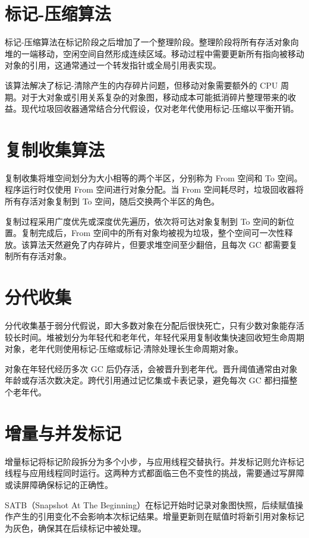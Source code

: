 \chapter{标记-压缩算法}
标记-压缩算法在标记阶段之后增加了一个整理阶段。整理阶段将所有存活对象向堆的一端移动，空闲空间自然形成连续区域。移动过程中需要更新所有指向被移动对象的引用，这通常通过一个转发指针或全局引用表实现。\par
该算法解决了标记-清除产生的内存碎片问题，但移动对象需要额外的 CPU 周期。对于大对象或引用关系复杂的对象图，移动成本可能抵消碎片整理带来的收益。现代垃圾回收器通常结合分代假设，仅对老年代使用标记-压缩以平衡开销。\par
\chapter{复制收集算法}
复制收集将堆空间划分为大小相等的两个半区，分别称为 From 空间和 To 空间。程序运行时仅使用 From 空间进行对象分配。当 From 空间耗尽时，垃圾回收器将所有存活对象复制到 To 空间，随后交换两个半区的角色。\par
复制过程采用广度优先或深度优先遍历，依次将可达对象复制到 To 空间的新位置。复制完成后，From 空间中的所有对象均被视为垃圾，整个空间可一次性释放。该算法天然避免了内存碎片，但要求堆空间至少翻倍，且每次 GC 都需要复制所有存活对象。\par
\chapter{分代收集}
分代收集基于弱分代假说，即大多数对象在分配后很快死亡，只有少数对象能存活较长时间。堆被划分为年轻代和老年代，年轻代采用复制收集快速回收短生命周期对象，老年代则使用标记-压缩或标记-清除处理长生命周期对象。\par
对象在年轻代经历多次 GC 后仍存活，会被晋升到老年代。晋升阈值通常由对象年龄或存活次数决定。跨代引用通过记忆集或卡表记录，避免每次 GC 都扫描整个老年代。\par
\chapter{增量与并发标记}
增量标记将标记阶段拆分为多个小步，与应用线程交替执行。并发标记则允许标记线程与应用线程同时运行。这两种方式都面临三色不变性的挑战，需要通过写屏障或读屏障确保标记的正确性。\par
SATB（Snapshot At The Beginning）在标记开始时记录对象图快照，后续赋值操作产生的引用变化不会影响本次标记结果。增量更新则在赋值时将新引用对象标记为灰色，确保其在后续标记中被处理。\par
